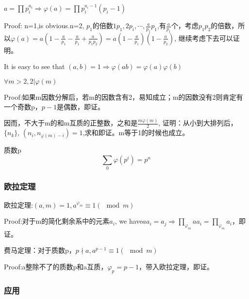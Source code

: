 \documentclass[UTF8]{../09-Mathematics}
\begin{document}
\begin{proposition}
    $a = \prod p_i ^{a_i} \Rightarrow \varphi(a) = \prod p_i^{a_i-1}(p_i-1)$

    Proof: n=1,is obvious.n=2, $p_1$的倍数$1p_1, 2p_i, \cdots, \frac{a}{p_1}p_1$,有$\frac{a}{p_1}$个，考虑$p_1p_2$的倍数，所以$\varphi(a) = a(1-\frac{a}{p_1}-\frac{a}{p_1}+\frac{a}{p_1p_2}) = a(1-\frac{a}{p_1})(1-\frac{a}{p_2})$, 继续考虑下去可以证明。

    It is easy to see that $(a,b) = 1 \Rightarrow \varphi(ab) = \varphi(a)\varphi(b)$
\end{proposition}

\begin{proposition}
    $\forall m>2, 2 |\varphi(m)$

    Proof:如果m因数分解后，若m的因数含有2，易知成立；m的因数没有2则肯定有一个奇数p，$p-1$是偶数，即证。

    因而，不大于m的和m互质的正整数，之和是$\frac{m \varphi(m)}{2}$, 证明：从小到大排列后，$\{n_k\}$, $(n_{i}, n_{\varphi(m)-i}) = 1$,求和即证。m等于1的时候也成立。
\end{proposition}

\begin{proposition}
    质数p$$\sum_0\varphi(p^i) = p^n$$
\end{proposition}





\subsubsection{欧拉定理}
\begin{definition}
    欧拉定理:$(a,m) = 1, a^{\varphi_m} \equiv 1 (\mod m)$

    Proof:对于m的简化剩余系中的元素$a_i$, we have$aa_i = a_j \Rightarrow \prod_{\varphi_m}aa_i = \prod_{\varphi_m}a_i$，即证。
\end{definition}


\begin{definition}
    费马定理：对于质数p，$p \nmid a, a^{p-1} \equiv 1 (\mod m)$

    Proof:a整除不了的质数p和a互质，$\varphi_p = p-1$，带入欧拉定理，即证。
\end{definition}

\subsubsection{应用}
\end{document}
